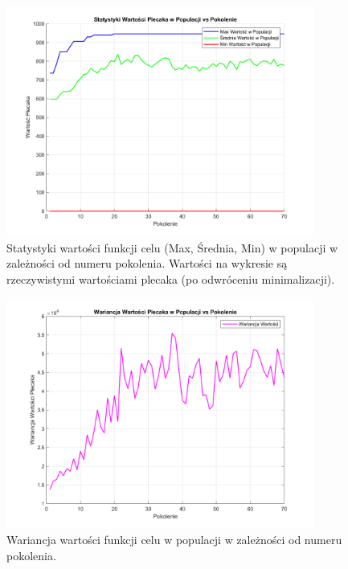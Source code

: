 \documentclass[a4paper, 11pt]{article}
\begin{document}
\begin{figure}[H]
    \centering
    \includegraphics[width=0.9\textwidth]{statistics_plot.png}
    \caption{Statystyki wartości funkcji celu (Max, Średnia, Min) w populacji w zależności od numeru pokolenia. Wartości na wykresie są rzeczywistymi wartościami plecaka (po odwróceniu minimalizacji).}
    \label{fig:stats_plot}
\end{figure}

\begin{figure}[H]
    \centering
    \includegraphics[width=0.9\textwidth]{variance_plot.png}
    \caption{Wariancja wartości funkcji celu w populacji w zależności od numeru pokolenia.}
    \label{fig:variance_plot}
\end{figure}

\newpage
\end{document}
